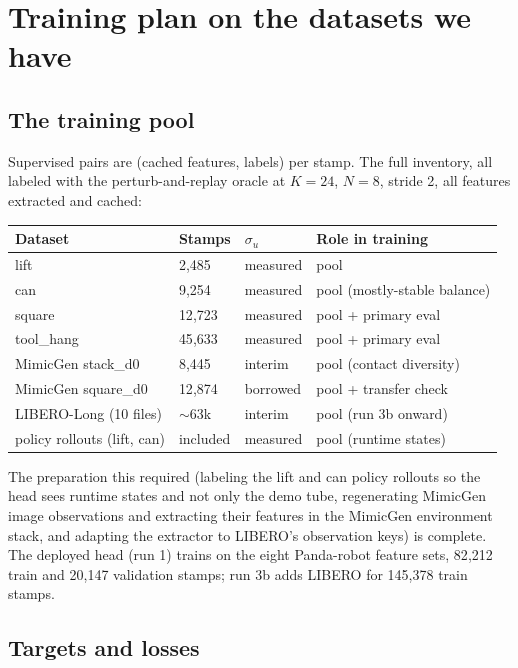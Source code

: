 \documentclass[11pt]{article}
\begin{document}
\section{Training plan on the datasets we have}
\label{sec:plan}

\subsection{The training pool}

Supervised pairs are (cached features, labels) per stamp. The full inventory,
all labeled with the perturb-and-replay oracle at $K{=}24$, $N{=}8$, stride 2,
all features extracted and cached:

\begin{center}
\small
\begin{tabular}{@{}llll@{}}
\toprule
Dataset & Stamps & $\sigma_u$ & Role in training \\
\midrule
lift & 2{,}485 & measured & pool \\
can & 9{,}254 & measured & pool (mostly-stable balance) \\
square & 12{,}723 & measured & pool + primary eval \\
tool\_hang & 45{,}633 & measured & pool + primary eval \\
MimicGen stack\_d0 & 8{,}445 & interim & pool (contact diversity) \\
MimicGen square\_d0 & 12{,}874 & borrowed & pool + transfer check \\
LIBERO-Long (10 files) & $\sim$63k & interim & pool (run 3b onward) \\
policy rollouts (lift, can) & included & measured & pool (runtime states) \\
\bottomrule
\end{tabular}
\end{center}

The preparation this required (labeling the lift and can policy rollouts so the
head sees runtime states and not only the demo tube, regenerating MimicGen
image observations and extracting their features in the MimicGen environment
stack, and adapting the extractor to LIBERO's observation keys) is complete.
The deployed head (run 1) trains on the eight Panda-robot feature sets, 82{,}212
train and 20{,}147 validation stamps; run 3b adds LIBERO for 145{,}378 train
stamps.

\subsection{Targets and losses}
\end{document}
